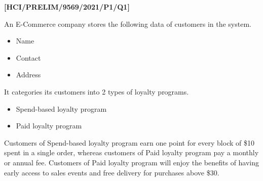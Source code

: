 \item \textbf{{[}HCI/PRELIM/9569/2021/P1/Q1{]} }

An E-Commerce company stores the following data of customers in the
system. 
\begin{itemize}
\item Name 
\item Contact 
\item Address 
\end{itemize}
It categories its customers into 2 types of loyalty programs. 
\begin{itemize}
\item Spend-based loyalty program 
\item Paid loyalty program 
\end{itemize}
Customers of Spend-based loyalty program earn one point for every
block of \$10 spent in a single order, whereas customers of Paid loyalty
program pay a monthly or annual fee. Customers of Paid loyalty program
will enjoy the benefits of having early access to sales events and
free delivery for purchases above \$30. 

